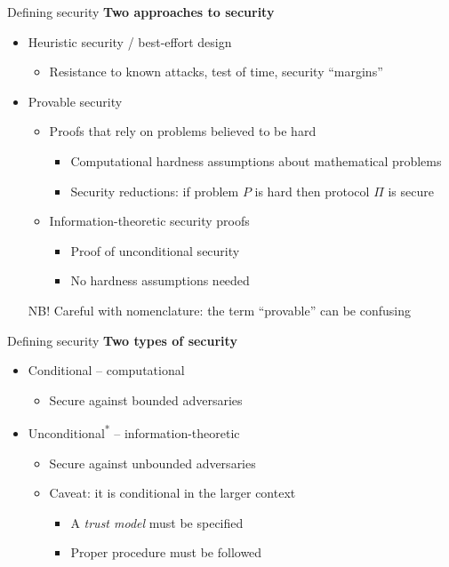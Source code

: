 \begin{frame}{Defining security}
  \textbf{Two approaches to security}
  \begin{itemize}
    \pause
    \item Heuristic security / best-effort design
    \begin{itemize}
      \item Resistance to known attacks, test of time, security \enquote{margins}
    \end{itemize}
    \pause
    \item Provable security
    \begin{itemize}
      \pause
      \item Proofs that rely on problems believed to be hard
      \begin{itemize}
        \item Computational hardness assumptions about mathematical problems
        \item Security reductions: if problem $P$ is hard then protocol $\Pi$ is secure
      \end{itemize}

      \pause
      \item Information-theoretic security proofs
      \begin{itemize}
        \item Proof of unconditional security
        \item No hardness assumptions needed
      \end{itemize}
    \end{itemize}

    \vspace*{1em}

    \pause
    NB! Careful with nomenclature: the term \enquote{provable} can be confusing
  \end{itemize}
\end{frame}

\begin{frame}{Defining security}
  \textbf{Two types of security}
  \begin{itemize}[<+(1)->]
    \item Conditional -- computational
    \begin{itemize}
      \item Secure against bounded adversaries
    \end{itemize}
    \item Unconditional\textsuperscript{*} -- information-theoretic
    \begin{itemize}
      \item Secure against unbounded adversaries
      \item Caveat: it is conditional in the larger context
      \par
      \begin{itemize}
        \item A \emph{trust model} must be specified
        \item Proper procedure must be followed
      \end{itemize}
    \end{itemize}
  \end{itemize}
\end{frame}

